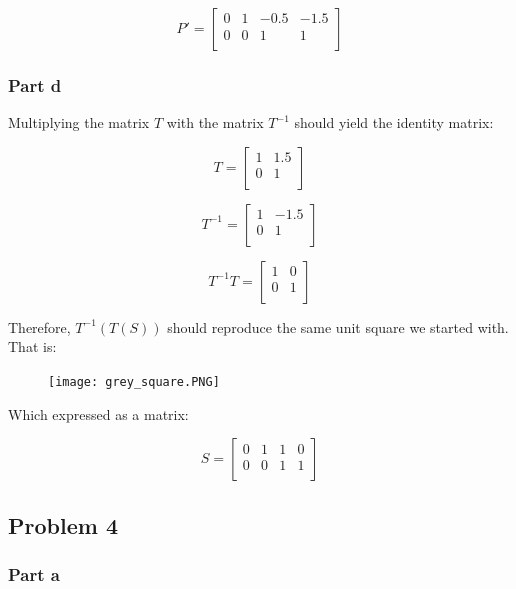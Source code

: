 \documentclass{article}
\begin{document}
\[P' = 
\begin{bmatrix}
    0 & 1 & -0.5 & -1.5 \\
    0 & 0 & 1 & 1 \\
\end{bmatrix}
\]




\subsubsection*{Part d}

Multiplying the matrix $T$ with the matrix $T^{-1}$ should yield the identity matrix:

\[T = 
\begin{bmatrix}
    1 & 1.5  \\
    0 & 1  \\
\end{bmatrix}
\]

\[T^{-1} = 
\begin{bmatrix}
    1 & -1.5  \\
    0 & 1  \\
\end{bmatrix}
\]

\[T^{-1} T = 
\begin{bmatrix}
    1 & 0  \\
    0 & 1  \\
\end{bmatrix}
\]

Therefore, $T^{-1}(T(S))$ should reproduce the same unit square we started with. That is:

\begin{figure}[!htb]
  \centering
  \texttt{[image: grey\_square.PNG]}
  \label{fig3}
\end{figure}

Which expressed as a matrix:

\[S = 
\begin{bmatrix}
    0 & 1 & 1 & 0 \\
    0 & 0 & 1 & 1 \\
\end{bmatrix}
\]

\subsection*{Problem 4}

\subsubsection*{Part a}
\end{document}
